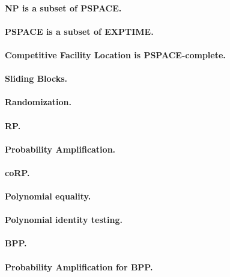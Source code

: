 \documentclass[11pt,a4paper]{article}
\theoremstyle{definition}
\begin{document}
\paragraph{NP is a subset of PSPACE.}

\paragraph{PSPACE is a subset of EXPTIME.}

\paragraph{Competitive Facility Location is PSPACE-complete.}

\paragraph{Sliding Blocks.}

\paragraph{Randomization.}

\paragraph{RP.}

\paragraph{Probability Amplification.}

\paragraph{coRP.}

\paragraph{Polynomial equality.}
\paragraph{Polynomial identity testing.}

\paragraph{BPP.}

\paragraph{Probability Amplification for BPP.}
\end{document}
